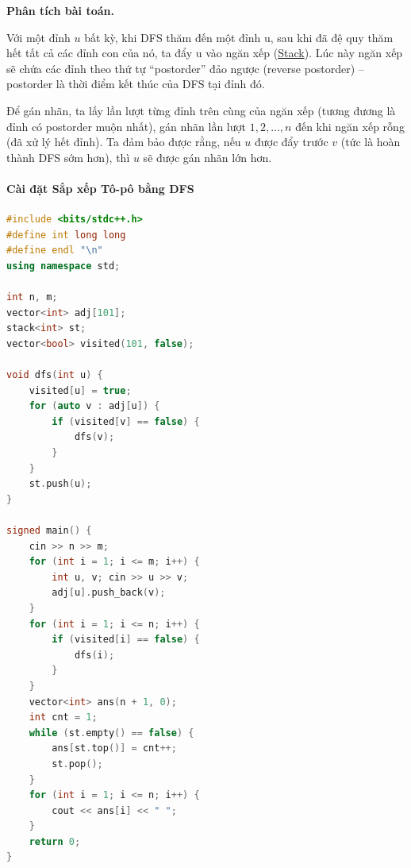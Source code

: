 \textbf{Phân tích bài toán.}

Với một đỉnh $u$ bất kỳ, khi DFS thăm đến một đỉnh u, sau khi đã đệ quy thăm hết tất cả các đỉnh con của nó, ta đẩy u vào ngăn xếp (\href{https://wiki.vnoi.info/algo/data-structures/Stack}{Stack}). Lúc này ngăn xếp sẽ chứa các đỉnh theo thứ tự ``postorder'' đảo ngược (reverse postorder) -- postorder là thời điểm kết thúc của DFS tại đỉnh đó. 

Để gán nhãn, ta lấy lần lượt từng đỉnh trên cùng của ngăn xếp (tương đương là đỉnh có postorder muộn nhất), gán nhãn lần lượt $1, 2, \dots, n$ đến khi ngăn xếp rỗng (đã xử lý hết đỉnh). Ta đảm bảo được rằng, nếu $u$ được đẩy trước $v$ (tức là hoàn thành DFS sớm hơn), thì $u$ sẽ được gán nhãn lớn hơn.


\paragraph{Cài đặt Sắp xếp Tô-pô bằng DFS}
\begin{lstlisting}[language=C++]
#include <bits/stdc++.h>
#define int long long
#define endl "\n"
using namespace std;

int n, m;
vector<int> adj[101];
stack<int> st;
vector<bool> visited(101, false);

void dfs(int u) {
    visited[u] = true;
    for (auto v : adj[u]) {
        if (visited[v] == false) {
            dfs(v);
        }
    }
    st.push(u);
}

signed main() {
    cin >> n >> m;
    for (int i = 1; i <= m; i++) {
        int u, v; cin >> u >> v;
        adj[u].push_back(v);
    }    
    for (int i = 1; i <= n; i++) {
        if (visited[i] == false) {
            dfs(i);
        }
    }
    vector<int> ans(n + 1, 0);
    int cnt = 1;
    while (st.empty() == false) {
        ans[st.top()] = cnt++;
        st.pop();
    }
    for (int i = 1; i <= n; i++) {
        cout << ans[i] << " ";
    }
    return 0;
}

\end{lstlisting}

